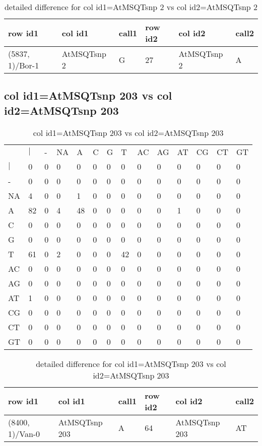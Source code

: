 \begin{center}
\begin{longtable}{|l|l|l|l|l|l|}
\caption{detailed difference for col id1=AtMSQTsnp 2 vs col id2=AtMSQTsnp 2} \label{table_dm579}\\
\hline
row id1&col id1&call1&row id2&col id2&call2\\
\hline
(5837, 1)/Bor-1&AtMSQTsnp 2&G&27&AtMSQTsnp 2&A\\
\hline
\end{longtable}
\end{center}

\subsection{col id1=AtMSQTsnp 203 vs col id2=AtMSQTsnp 203}
\begin{center}
\begin{longtable}{|l|l|l|l|l|l|l|l|l|l|l|l|l|l|}
\caption{col id1=AtMSQTsnp 203 vs col id2=AtMSQTsnp 203} \label{table_dm580}\\
\hline
\\
\hline
&$|$&-&NA&A&C&G&T&AC&AG&AT&CG&CT&GT\\
$|$&0&0&0&0&0&0&0&0&0&0&0&0&0\\
-&0&0&0&0&0&0&0&0&0&0&0&0&0\\
NA&4&0&0&1&0&0&0&0&0&0&0&0&0\\
A&82&0&4&48&0&0&0&0&0&1&0&0&0\\
C&0&0&0&0&0&0&0&0&0&0&0&0&0\\
G&0&0&0&0&0&0&0&0&0&0&0&0&0\\
T&61&0&2&0&0&0&42&0&0&0&0&0&0\\
AC&0&0&0&0&0&0&0&0&0&0&0&0&0\\
AG&0&0&0&0&0&0&0&0&0&0&0&0&0\\
AT&1&0&0&0&0&0&0&0&0&0&0&0&0\\
CG&0&0&0&0&0&0&0&0&0&0&0&0&0\\
CT&0&0&0&0&0&0&0&0&0&0&0&0&0\\
GT&0&0&0&0&0&0&0&0&0&0&0&0&0\\
\hline
\end{longtable}
\end{center}

\begin{center}
\begin{longtable}{|l|l|l|l|l|l|}
\caption{detailed difference for col id1=AtMSQTsnp 203 vs col id2=AtMSQTsnp 203} \label{table_dm581}\\
\hline
row id1&col id1&call1&row id2&col id2&call2\\
\hline
(8400, 1)/Van-0&AtMSQTsnp 203&A&64&AtMSQTsnp 203&AT\\
\hline
\end{longtable}
\end{center}

